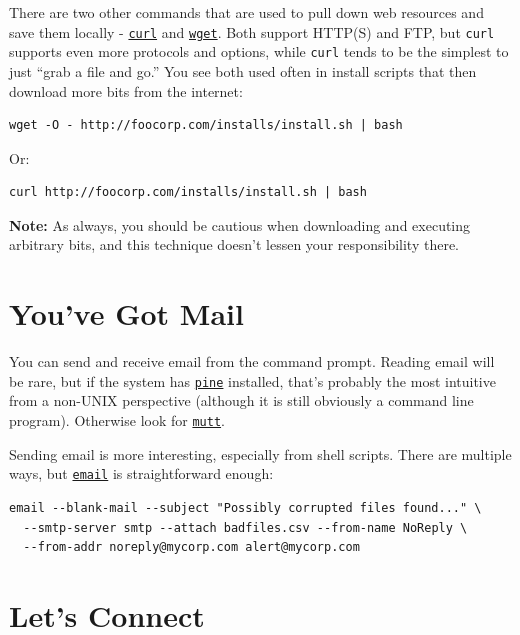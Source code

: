 \documentclass[10pt,]{book}
\numberwithin{figure}{chapter}
\begin{document}
There are two other commands that are used to pull down web resources
and save them locally -
\href{http://linux.die.net/man/1/curl}{\texttt{curl}} and
\href{http://linux.die.net/man/1/wget}{\texttt{wget}}. Both support
HTTP(S) and FTP, but \texttt{curl} supports even more protocols and
options, while \texttt{curl} tends to be the simplest to just ``grab a
file and go.'' You see both used often in install scripts that then
download more bits from the internet:

\begin{verbatim}
wget -O - http://foocorp.com/installs/install.sh | bash
\end{verbatim}

Or:

\begin{verbatim}
curl http://foocorp.com/installs/install.sh | bash
\end{verbatim}

\textbf{Note:} As always, you should be cautious when downloading and
executing arbitrary bits, and this technique doesn't lessen your
responsibility there.

\section{You've Got Mail}\label{youve-got-mail}

You can send and receive email from the command prompt. Reading email
will be rare, but if the system has
\href{http://linux.die.net/man/1/pine}{\texttt{pine}} installed, that's
probably the most intuitive from a non-UNIX perspective (although it is
still obviously a command line program). Otherwise look for
\href{http://linux.die.net/man/1/mutt}{\texttt{mutt}}.

Sending email is more interesting, especially from shell scripts. There
are multiple ways, but
\href{http://linux.die.net/man/1/email}{\texttt{email}} is
straightforward enough:

\begin{verbatim}
email --blank-mail --subject "Possibly corrupted files found..." \
  --smtp-server smtp --attach badfiles.csv --from-name NoReply \
  --from-addr noreply@mycorp.com alert@mycorp.com
\end{verbatim}

\section{Let's Connect}\label{lets-connect}
\end{document}
